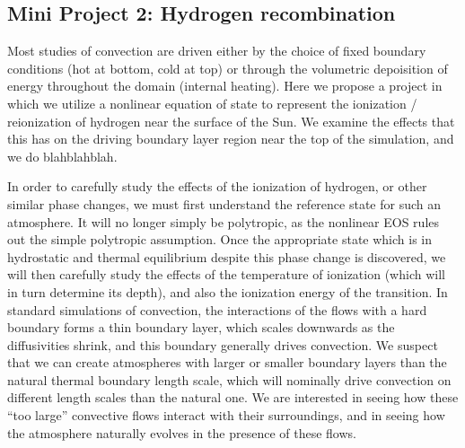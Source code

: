 \documentclass[aasms,12pt]{article}
\begin{document}
%
%
%

\subsection{Mini Project 2: Hydrogen recombination}
Most studies of convection are driven either by the choice of fixed boundary conditions
(hot at bottom, cold at top) or through the volumetric depoisition of energy throughout
the domain (internal heating).  Here we propose a project in which we utilize a nonlinear
equation of state to represent the ionization / reionization of hydrogen near the surface of
the Sun.  We examine the effects that this has on the driving boundary layer region near the
top of the simulation, and we do blahblahblah.

In order to carefully study the effects of the ionization of hydrogen, or other similar phase
changes, we must first understand the reference state for such an atmosphere.  It will no longer
simply be polytropic, as the nonlinear EOS rules out the simple polytropic assumption. Once the
appropriate state which is in hydrostatic and thermal equilibrium despite this phase change is discovered,
we will then carefully study the effects of the temperature of ionization (which will in turn
determine its depth), and also the ionization energy of the transition.  In standard simulations
of convection, the interactions of the flows with a hard boundary forms a thin boundary layer,
which scales downwards as the diffusivities shrink, and this boundary generally drives convection.
We suspect that we can create atmospheres with larger or smaller boundary layers than the natural
thermal boundary length scale, which will nominally drive convection on different length scales
than the natural one.  We are interested in seeing how these ``too large'' convective flows
interact with their surroundings, and in seeing how the atmosphere naturally evolves in the presence
of these flows.
\end{document}
